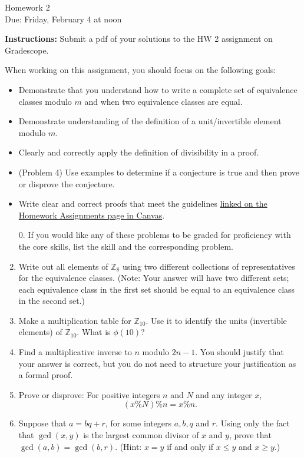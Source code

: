 \documentclass[12pt]{article}
\newcommand{\Z}{\mathbb{Z}}
\begin{document}
\begin{center}
{\Large Homework 2}\\
Due: Friday,  February 4 at noon\\


\end{center}
{\bf Instructions:} Submit a pdf of your solutions to the HW 2 assignment on Gradescope. 

When working on this assignment, you should focus on the following goals:
\begin{itemize}
\item Demonstrate that you understand how to write a complete set of equivalence classes modulo $m$ and when two equivalence classes are equal. 
\item Demonstrate understanding of the definition of a unit/invertible element modulo $m$.  
\item Clearly and correctly apply the definition of divisibility in a proof. 
\item (Problem 4) Use examples to determine if a conjecture is true and then prove or disprove the conjecture. 
\item Write clear and correct proofs that meet the guidelines \href{https://canvas.umn.edu/courses/292043/pages/writing-guidelines}{linked on the Homework Assignments page in Canvas}.
\end{itemize}

\begin{enumerate}
\item[0.] If you would like any of these problems to be graded for proficiency with the core skills, list the skill and the corresponding problem. 
\item Write out all elements of $\Z_{8}$ using two different collections of representatives for the equivalence classes.  (Note: Your answer will have two different sets; each equivalence class in the first set should be equal to an equivalence class in the second set.)
\item Make a multiplication table for $\Z_{10}$. Use it to identify the units (invertible elements) of $\Z_{10}$.  What is $\phi(10)$?
\item Find a multiplicative inverse to $n$ modulo $2n-1$. You should justify that your answer is correct, but you do not need to structure your justification as a formal proof. 

\item Prove or disprove: For positive integers $n$ and $N$ and any integer $x$, $$(x\% N)\% n= x\% n.$$

\item Suppose that $a=bq+r$, for some integers $a,b, q$ and $r$. Using only the fact that $\gcd(x,y)$ is the largest common divisor of $x$ and $y$, prove that $\gcd(a,b)=\gcd(b,r)$.  (Hint: $x=y$ if and only if $x\le y$ and $x\ge y$.)

\end{enumerate}
\end{document}
